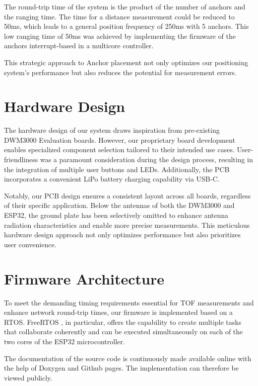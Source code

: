 \documentclass[10pt,a4paper,twocolumn]{article}
\begin{document}
The round-trip time of the system is the product of the number of anchors and the ranging time.
The time for a distance measurement could be reduced to 50ms, which leads to a general position frequency of 250ms with 5 anchors.
This low ranging time of 50ms was achieved by implementing the firmware of the anchors interrupt-based in a multicore controller.

This strategic approach to Anchor placement not only optimizes
our positioning system's performance but also reduces the potential
for measurement errors.

\section{Hardware Design}\label{section:hardware}
The hardware design of our system draws inspiration from pre-existing DWM3000 Evaluation
boards.
However, our proprietary board development enables specialized component selection
tailored to their intended use cases.
User-friendliness was a paramount consideration during the design process,
resulting in the integration of multiple user buttons and LEDs.
Additionally, the PCB incorporates a convenient LiPo battery charging capability
via USB-C.

Notably, our PCB design ensures a consistent layout across all boards,
regardless of their specific application.
Below the antennas of both the DWM3000 and ESP32,
the ground plate has been selectively omitted to enhance antenna radiation
characteristics and enable more precise measurements.
This meticulous hardware design approach not only optimizes
performance but also prioritizes user convenience. 

\section{Firmware Architecture}\label{section:firmware}
To meet the demanding timing requirements essential for \ac{TOF}
measurements and enhance network round-trip times,
our firmware is implemented based on a \ac{RTOS}.
FreeRTOS \cite{FreeRTOS_2023}, in particular,
offers the capability to create multiple tasks that collaborate coherently
and can be executed simultaneously on each of the two cores of the ESP32 microcontroller.

The documentation of the source code is continuously made available online with the help of Doxygen and Github pages.
The implementation can therefore be viewed publicly\cite{doxygen-doku}.
\end{document}
